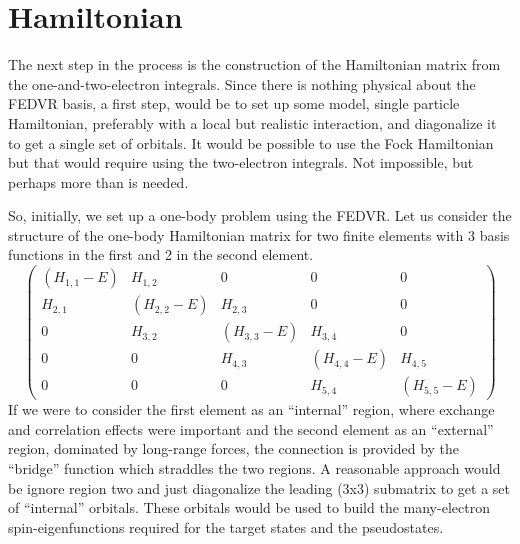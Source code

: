 \documentclass[preprint,showpacs,preprintnumbers,amsmath,amssymb]{revtex4}
\begin{document}
\section{Hamiltonian}
The next step in the process is the construction of the Hamiltonian matrix
from the one-and-two-electron integrals.  Since there is nothing physical about
the FEDVR basis, a first step, would be to set up some model, single particle
Hamiltonian, preferably with a local but realistic interaction, and diagonalize
it to get a single set of orbitals.  It would be possible to use the Fock
Hamiltonian but that would require using the two-electron integrals.  Not
impossible, but perhaps more than is needed.  
\par
So, initially, we set up a one-body problem using the FEDVR.  Let us consider
the structure of the one-body Hamiltonian matrix for two finite elements with
3 basis functions in the first and 2 in the second element.
 \[ \left ( \begin{array}{lllll}
(H_{1,1} - E) & H_{1,2} & 0 & 0 & 0 \\
H_{2,1} & (H_{2,2} - E ) & H_{2,3} & 0 & 0 \\
0 & H_{3,2} & ( H_{3,3} - E ) & H_{3,4} & 0 \\
0 & 0 & H_{4,3} & ( H_{4,4} - E ) & H_{4,5} \\
0 & 0 & 0 & H_{5,4} & ( H_{5,5} - E )
\end{array} \right ) \]
If we were to consider the first element as an ``internal'' region, where
exchange and correlation effects were important and the second element as an
``external'' region, dominated by long-range forces, the connection is
provided by the ``bridge'' function which straddles the two regions.  A 
reasonable approach would be ignore region two and just diagonalize the
leading (3x3) submatrix to get a set of ``internal'' orbitals.  These orbitals
would be used to build the many-electron spin-eigenfunctions required for
the target states and the pseudostates.
\end{document}
